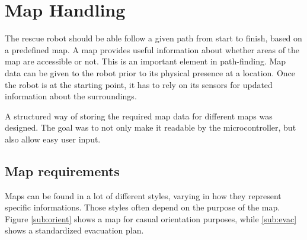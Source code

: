 





\chapter{Map Handling}
\label{ch:map} %
The rescue robot should be able follow a given path from start to finish, based on a predefined map.
A map provides useful information about whether areas of the map are accessible or not. This is an important element in path-finding.
Map data can be given to the robot prior to its physical presence at a location. Once the robot is at the starting point, it has to rely on its sensors for updated information about the surroundings.

A structured way of storing the required map data for different maps was designed. 
The goal was to not only make it readable by the microcontroller,
but also allow easy user input.


\newpage
\section{Map requirements}
\label{ch:map_requirements}
Maps can be found in a lot of different styles,
varying in how they represent specific informations.
Those styles often depend on the purpose of the map.
Figure \ref{sub:orient} shows a map for casual orientation purposes,
while \ref{sub:evac} shows a standardized evacuation plan.

